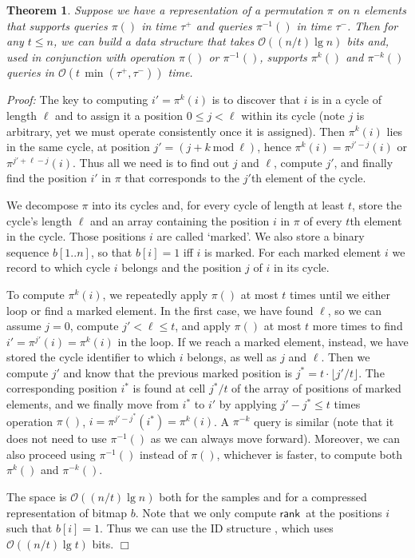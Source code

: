 \documentclass[11pt]{article}
\newtheorem{theorem}{Theorem}
\newenvironment{proof}{\textit{Proof:}}{\hfill$\Box$ \paragraph{} }
\providecommand{\pii}{\ensuremath{\pi^{-1}}}
\newcommand{\Oh}[1]
    {\ensuremath{\mathcal{O}\left( {#1} \right)}}
\newcommand{\rank}
    {\ensuremath{\mathsf{rank}}}
\begin{document}
\begin{theorem} \label{thm:exponent} Suppose we have a representation
  of a permutation $\pi$ on $n$ elements that supports queries $\pi()$ 
  in time \(\tau^+\) and queries $\pii()$ in time $\tau^-$. 
  Then for any \(t \leq n\), we can build a data structure that takes 
  $\Oh{(n / t) \lg n}$ bits and, used in conjunction with operation $\pi()$
  or $\pii()$, supports $\pi^k()$ and $\pi^{-k}()$ queries in 
  $\Oh{t\,\min(\tau^+,\tau^-)}$ time.
\end{theorem}

\begin{proof}
The key to computing $i'=\pi^k(i)$ is to discover that $i$ is in a cycle of length
$\ell$ and to assign it a position $0 \le j < \ell$ within its cycle (note
$j$ is arbitrary, yet we must operate consistently once it is assigned).
Then $\pi^k(i)$ lies in the same cycle, at position 
$j' = (j+k~\textrm{mod}~\ell)$, hence $\pi^k(i) = \pi^{j'-j}(i)$ or
$\pi^{j'+\ell-j}(i)$. Thus all we need is to 
find out $j$ and $\ell$, compute $j'$, and finally find the position $i'$ in
$\pi$ that corresponds to the $j'$th element of the cycle.

We decompose $\pi$ into its cycles and, for every cycle of length at least $t$,
store the cycle's length $\ell$ and an array containing the position $i$ in 
$\pi$ of every $t$th element in the cycle. Those positions $i$ are called 
`marked'.  We also store a binary sequence $b[1..n]$, so that $b[i]=1$ iff $i$ 
is marked. For each marked element $i$ we record to which cycle $i$ belongs and 
the position $j$ of $i$ in its cycle.

To compute \(\pi^k (i)\), we repeatedly apply $\pi()$ at most $t$ times until 
we either loop or find a marked element. In the first case, we have found $\ell$,
so we can assume $j=0$, compute $j' < \ell \le t$, and apply $\pi()$ at most $t$ 
more times to find \(i'=\pi^{j'}(i)=\pi^k (i)\) in the loop. If we reach a 
marked element, instead, we have stored 
the cycle identifier to which $i$ belongs, as well as $j$ and $\ell$. Then we 
compute $j'$ and know that the previous marked position is 
$j^* = t \cdot \lfloor j'/t \rfloor$. The corresponding position $i^*$ is found
at cell $j^*/t$ of the array of positions of marked elements, and we finally
move from $i^*$ to $i'$ by applying $j'-j^* \le t$ times operation $\pi()$,
$i = \pi^{j'-j^*}(i^*)=\pi^k(i)$.
A $\pi^{- k}$ query is similar (note that it does not need to use $\pii()$ as
we can always move forward). Moreover, we can also proceed using $\pi^{-1}()$
instead of $\pi()$, whichever is faster, to compute both $\pi^k()$ and 
$\pi^{-k}()$.

The space is $\Oh{(n/t)\lg n}$ both for the samples and for a compressed
representation of bitmap $b$. Note that we only compute \rank\ at the
positions $i$ such that $b[i]=1$. Thus we can use the ID structure 
\cite{RRR02}, which uses $\Oh{(n/t)\lg t}$ bits.
\end{proof}
\end{document}
